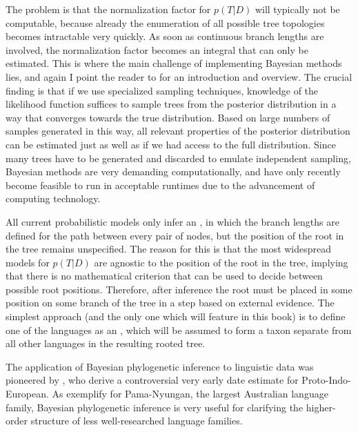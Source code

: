 The problem is that the normalization factor for $p(T|D)$ will typically not be computable, because already the enumeration of all possible tree topologies becomes intractable very quickly. As soon as continuous branch lengths are involved, the normalization factor becomes an integral that can only be estimated. This is where the main challenge of implementing Bayesian methods lies, and again I point the reader to \citet[Ch. 18]{felsenstein2004} for an introduction and overview. The crucial finding is that if we use specialized sampling techniques, knowledge of the likelihood function suffices to sample trees from the posterior distribution in a way that converges towards the true distribution. Based on large numbers of samples generated in this way, all relevant properties of the posterior distribution can be estimated just as well as if we had access to the full distribution. Since many trees have to be generated and discarded to emulate independent sampling, Bayesian methods are very demanding computationally, and have only recently become feasible to run in acceptable runtimes due to the advancement of computing technology.

All current probabilistic models only infer an \textit{}, in which the branch lengths are defined for the path between every pair of nodes, but the position of the root in the tree remains unspecified. The reason for this is that the most widespread models for $p(T|D)$ are agnostic to the position of the root in the tree, implying that there is no mathematical criterion that can be used to decide between possible root positions. Therefore, after inference the root must  be placed in some position on some branch of the tree in a \textit{} step based on external evidence. The simplest approach (and the only one which will feature in this book) is to define one of the languages as an \textit{}, which will be assumed to form a taxon separate from all other languages in the resulting rooted tree.

The application of Bayesian phylogenetic inference to linguistic data was pioneered by \citet{gray_atkinson_2003}, who derive a controversial very early date estimate for Proto-Indo-European. As \citet{bowern_atkinson_2012} exemplify for Pama-Nyungan, the largest Australian language family, Bayesian phylogenetic inference is very useful for clarifying the higher-order structure of less well-researched language families.

